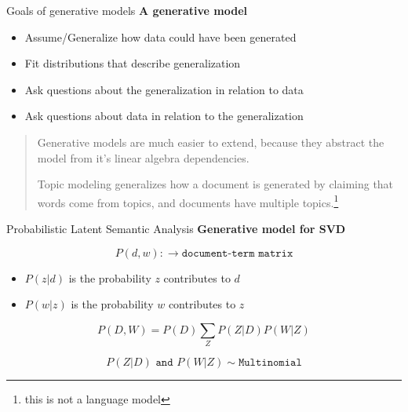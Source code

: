 \documentclass[10pt]{beamer}
\begin{document}
\begin{frame}{Goals of generative models}
  {\bf A generative model}

  \begin{itemize}
  \item Assume/Generalize how data could have been generated
  \item Fit distributions that describe generalization
  \item Ask questions about the generalization in relation to data
  \item Ask questions about data in relation to the generalization
  \end{itemize}

  \vspace{1em}

  \begin{quote}
    Generative models are much easier to extend, because they abstract the model from it's linear algebra dependencies.

    \vspace{1em}

  Topic modeling generalizes how a document is generated by claiming that words come from topics, and documents have multiple topics.\footnote{this is not a language model} %

  \end{quote}

\end{frame}


\begin{frame}{Probabilistic Latent Semantic Analysis}
  {\bf Generative model for SVD}

  \[P(d,w):\rightarrow \texttt{document-term matrix}\]

    \begin{itemize}
    \item  $P(z|d)$ is the probability $z$ contributes to $d$
    \item  $P(w|z)$ is the probability $w$ contributes to $z$
    \end{itemize}

    \[P(D,W) = P(D)\sum_Z P(Z|D)P(W|Z)\]

    \[P(Z|D) \texttt{ and } P(W|Z) \sim \texttt{Multinomial}\]

\end{frame}
\end{document}

